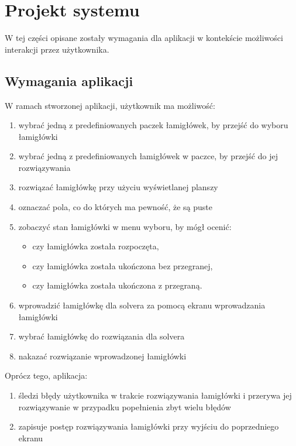 \chapter{Projekt systemu}
\thispagestyle{chapterBeginStyle}

    W tej części opisane zostały wymagania dla aplikacji w kontekście możliwości interakcji przez
użytkownika.



\section{Wymagania aplikacji}
    W ramach stworzonej aplikacji, użytkownik ma możliwość:
\begin{enumerate}
    \item wybrać jedną z predefiniowanych paczek łamigłówek, by przejść do wyboru łamigłówki
    \item wybrać jedną z predefiniowanych łamigłówek w paczce, by przejść do jej rozwiązywania
    \item rozwiązać łamigłówkę przy użyciu wyświetlanej planszy
    \item oznaczać pola, co do których ma pewność, że są puste
    \item zobaczyć stan łamigłówki w menu wyboru, by mógł ocenić:
    \begin{itemize}
        \item czy łamigłówka została rozpoczęta,
        \item czy łamigłówka została ukończona bez przegranej,
        \item czy łamigłówka została ukończona z przegraną.
    \end{itemize}
    \item wprowadzić łamigłówkę dla solvera za pomocą ekranu wprowadzania łamigłówki
    \item wybrać łamigłówkę do rozwiązania dla solvera
    \item nakazać rozwiązanie wprowadzonej łamigłówki
\end{enumerate}

    Oprócz tego, aplikacja:
\begin{enumerate}
    \item śledzi błędy użytkownika w trakcie rozwiązywania łamigłówki i przerywa jej rozwiązywanie
w przypadku popełnienia zbyt wielu błędów
    \item zapisuje postęp rozwiązywania łamigłówki przy wyjściu do poprzedniego ekranu
\end{enumerate}



